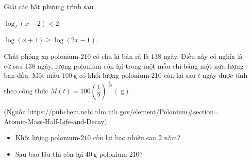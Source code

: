 \begin{bt}%
	Giải các bất phương trình sau
	\begin{listEX}[2]
		\item $\log_2(x-2)<2$.
		\item $\log (x+1) \geq \log (2x-1)$.
	\end{listEX}
\end{bt}

\begin{bt}%
	Chất phóng xạ polonium-$210$ có chu kì bán rã là $138$ ngày. Điều này có nghĩa là cứ sau 138 ngày, lượng polonium còn lại trong một mẫu chỉ bằng một nửa lượng ban đầu. Một mẫu $100 \mathrm{~g}$ có khối lượng polonium-$210$ còn lại sau $t$ ngày được tính theo công thức $M(t)=100\left(\dfrac{1}{2}\right)^{\tfrac{t}{138}}(\mathrm{~g})$.
	\begin{flushright}
		(Nguồn:https://pubchem.ncbi.nlm.nih.gov/element/Polonium\#section=\\
		Atomic-Mass-Half-Life-and-Decay)
	\end{flushright}
	\begin{itemize}
		\item[a)] Khối lượng polonium-$210$ còn lại bao nhiêu sau $2$ năm?
		\item[b)] Sau bao lâu thì còn lại $40 \mathrm{~g}$ polonium-$210$?
	\end{itemize}
\end{bt}

